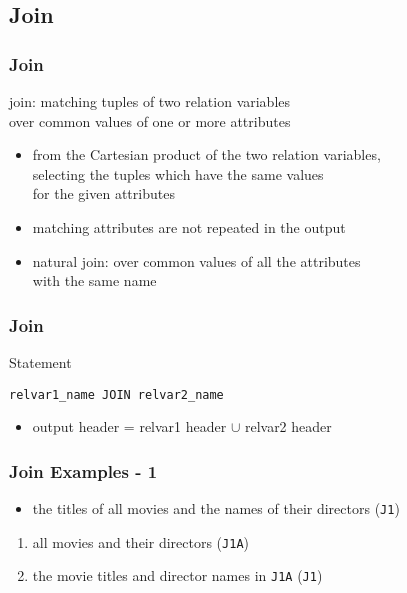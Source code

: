 \documentclass[dvipsnames]{beamer}
\theoremstyle{plain}
\begin{document}
\subsection{Join}

\begin{frame}[fragile]
  \frametitle{Join}

  \begin{definition}
    \alert{join}: matching tuples of two relation variables\\
      over common values of one or more attributes
  \end{definition}

  \begin{itemize}
    \item from the Cartesian product of the two relation variables,\\
      selecting the tuples which have the same values\\
      for the given attributes
    \item matching attributes are not repeated in the output

    \pause
    \item \alert{natural join}: over common values of all the attributes\\
      with the same name
  \end{itemize}
\end{frame}

\begin{frame}[fragile]
  \frametitle{Join}

  \begin{block}{Statement}
    \begin{lstlisting}
relvar1_name JOIN relvar2_name
    \end{lstlisting}
  \end{block}

  \pause
  \begin{itemize}
    \item output header = relvar1 header $\cup$ relvar2 header
  \end{itemize}
\end{frame}

\begin{frame}
  \frametitle{Join Examples - 1}

  \begin{example}
    \begin{itemize}
      \item the titles of all movies and the names of their directors
        (\texttt{J1})
    \end{itemize}

    \pause
    \begin{enumerate}
      \item all movies and their directors (\texttt{J1A})

      \pause
      \item the movie titles and director names in \texttt{J1A} (\texttt{J1})
    \end{enumerate}
  \end{example}
\end{frame}
\end{document}
